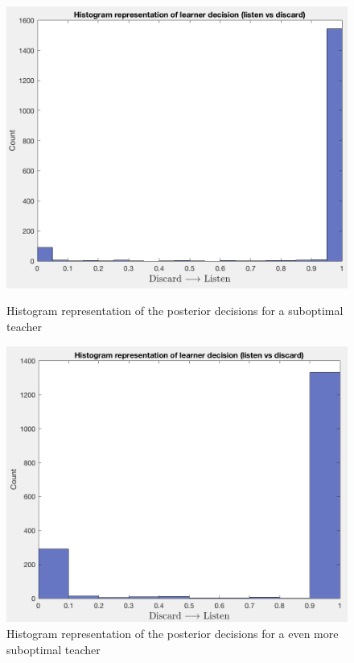 \documentclass[a4paper]{report}
\begin{document}
{{{{				
				\begin{figure}[h!]
					\begin{minipage}{0.5\linewidth}
						\begin{center}
							\includegraphics[width=0.95\linewidth]{pos_des_120}
							\caption{Histogram representation of the posterior decisions for a suboptimal teacher}
							\label{fig::post_des_120}
						\end{center}
					\end{minipage}
					\begin{minipage}{0.5\linewidth}
						\begin{center}
							\includegraphics[width=0.95\linewidth]{pos_des_50}
							\caption{Histogram representation of the posterior decisions for a even more suboptimal teacher}
							\label{fig::post_des_50}
						\end{center}
					\end{minipage}
				\end{figure}
				
}}}}
\end{document}
